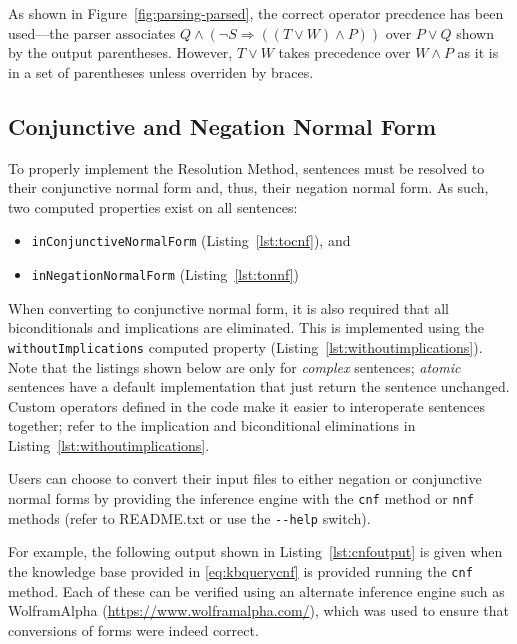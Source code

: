 As shown in Figure~\ref{fig:parsing-parsed}, the correct operator precdence has
been used---the parser associates $Q \wedge (\neg S \Rightarrow ((T \vee W) \wedge P))$
over $P \vee Q$ shown by the output parentheses. However, $T \vee W$ takes
precedence over $W \wedge P$ as it is in a set of parentheses unless overriden by braces.

\subsection{Conjunctive and Negation Normal Form}
\label{subs:CNF}

To properly implement the Resolution Method, sentences must be resolved to their
conjunctive normal form and, thus, their negation normal form. As such, two
computed properties exist on all sentences:

\begin{itemize}
  \item \texttt{inConjunctiveNormalForm} (Listing~\ref{lst:tocnf}), and
  \item \texttt{inNegationNormalForm} (Listing~\ref{lst:tonnf})
\end{itemize}

When converting to conjunctive normal form, it is also required that all biconditionals
and implications are eliminated. This is implemented using the \texttt{withoutImplications}
computed property (Listing~\ref{lst:withoutimplications}). Note that the listings shown below
are only for \emph{complex} sentences; \textit{atomic} sentences have a default
implementation that just return the sentence unchanged. Custom operators defined
in the code make it easier to interoperate sentences together; refer to the implication
and biconditional eliminations in Listing~\ref{lst:withoutimplications}.

Users can choose to convert their input files to either negation or conjunctive
normal forms by providing the inference engine with the \texttt{cnf} method or
\texttt{nnf} methods (refer to README.txt or use the \verb`--help` switch).

For example, the following output shown in Listing~\ref{lst:cnfoutput} is given
when the knowledge base provided in \ref{eq:kbquerycnf} is provided running
the \texttt{cnf} method. Each of these can be verified using an alternate
inference engine such as WolframAlpha (\url{https://www.wolframalpha.com/}),
which was used to ensure that conversions of forms were indeed correct.

